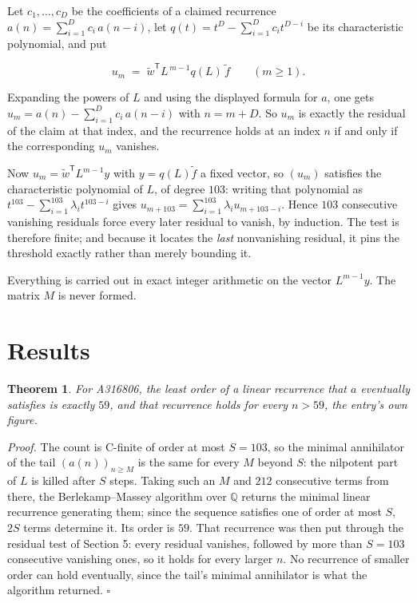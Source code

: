\documentclass[11pt]{article}
\newtheorem{theorem}{Theorem}
\theoremstyle{definition}
\begin{document}
Let $c_1,\dots,c_D$ be the coefficients of a claimed recurrence $a(n) = \sum_{i=1}^{D} c_i\,a(n-i)$, let $q(t) = t^{D} - \sum_{i=1}^{D} c_i t^{D-i}$ be its characteristic polynomial, and put

\[u_m \;=\; \tilde w^{\mathsf T} L^{\,m-1} q(L)\,\tilde f \qquad (m \ge 1).\]

Expanding the powers of $L$ and using the displayed formula for $a$, one gets $u_m = a(n) - \sum_{i=1}^{D} c_i\,a(n-i)$ with $n = m + D$. So $u_m$ is exactly the residual of the claim at that index, and the recurrence holds at an index $n$ if and only if the corresponding $u_m$ vanishes.

Now $u_m = \tilde w^{\mathsf T} L^{m-1} y$ with $y = q(L)\tilde f$ a fixed vector, so $(u_m)$ satisfies the characteristic polynomial of $L$, of degree $103$: writing that polynomial as $t^{103} - \sum_{i=1}^{103} \lambda_i t^{103-i}$ gives $u_{m+103} = \sum_{i=1}^{103} \lambda_i u_{m+103-i}$. Hence $103$ consecutive vanishing residuals force every later residual to vanish, by induction. The test is therefore finite; and because it locates the {\itshape last} nonvanishing residual, it pins the threshold exactly rather than merely bounding it.

Everything is carried out in exact integer arithmetic on the vector $L^{m-1}y$. The matrix $M$ is never formed.

\section{Results}

\begin{theorem} For A316806, the least order of a linear recurrence that $a$ eventually satisfies is exactly $59$, and that recurrence holds for every $n > 59$, the entry's own figure.\end{theorem}

{\itshape Proof.} The count is C-finite of order at most $S = 103$, so the minimal annihilator of the tail $(a(n))_{n \ge M}$ is the same for every $M$ beyond $S$: the nilpotent part of $L$ is killed after $S$ steps. Taking such an $M$ and $212$ consecutive terms from there, the Berlekamp--Massey algorithm over $\mathbb{Q}$ returns the minimal linear recurrence generating them; since the sequence satisfies one of order at most $S$, $2S$ terms determine it. Its order is $59$. That recurrence was then put through the residual test of Section 5: every residual vanishes, followed by more than $S = 103$ consecutive vanishing ones, so it holds for every larger $n$. No recurrence of smaller order can hold eventually, since the tail's minimal annihilator is what the algorithm returned. $\square$
\end{document}

